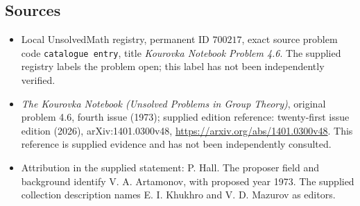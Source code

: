 \documentclass[11pt]{article}
\begin{document}
\subsection{Sources}
\begin{itemize}
\item Local UnsolvedMath registry, permanent ID \(700217\), exact source problem code \texttt{catalogue entry}, title \emph{Kourovka Notebook Problem 4.6}. The supplied registry labels the problem open; this label has not been independently verified.
\item \emph{The Kourovka Notebook (Unsolved Problems in Group Theory)}, original problem 4.6, fourth issue (1973); supplied edition reference: twenty-first issue edition (2026), arXiv:1401.0300v48, \url{https://arxiv.org/abs/1401.0300v48}. This reference is supplied evidence and has not been independently consulted.
\item Attribution in the supplied statement: P. Hall. The proposer field and background identify V. A. Artamonov, with proposed year 1973. The supplied collection description names E. I. Khukhro and V. D. Mazurov as editors.
\end{itemize}
\end{document}
